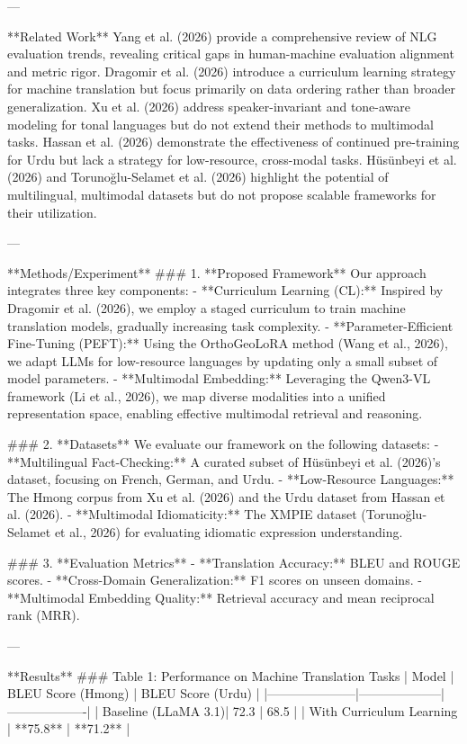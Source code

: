 ---

**Related Work**  
Yang et al. (2026) provide a comprehensive review of NLG evaluation trends, revealing critical gaps in human-machine evaluation alignment and metric rigor. Dragomir et al. (2026) introduce a curriculum learning strategy for machine translation but focus primarily on data ordering rather than broader generalization. Xu et al. (2026) address speaker-invariant and tone-aware modeling for tonal languages but do not extend their methods to multimodal tasks. Hassan et al. (2026) demonstrate the effectiveness of continued pre-training for Urdu but lack a strategy for low-resource, cross-modal tasks. Hüsünbeyi et al. (2026) and Torunoğlu-Selamet et al. (2026) highlight the potential of multilingual, multimodal datasets but do not propose scalable frameworks for their utilization.  

---

**Methods/Experiment**  
### 1. **Proposed Framework**  
Our approach integrates three key components:  
- **Curriculum Learning (CL):** Inspired by Dragomir et al. (2026), we employ a staged curriculum to train machine translation models, gradually increasing task complexity.  
- **Parameter-Efficient Fine-Tuning (PEFT):** Using the OrthoGeoLoRA method (Wang et al., 2026), we adapt LLMs for low-resource languages by updating only a small subset of model parameters.  
- **Multimodal Embedding:** Leveraging the Qwen3-VL framework (Li et al., 2026), we map diverse modalities into a unified representation space, enabling effective multimodal retrieval and reasoning.  

### 2. **Datasets**  
We evaluate our framework on the following datasets:  
- **Multilingual Fact-Checking:** A curated subset of Hüsünbeyi et al. (2026)'s dataset, focusing on French, German, and Urdu.  
- **Low-Resource Languages:** The Hmong corpus from Xu et al. (2026) and the Urdu dataset from Hassan et al. (2026).  
- **Multimodal Idiomaticity:** The XMPIE dataset (Torunoğlu-Selamet et al., 2026) for evaluating idiomatic expression understanding.  

### 3. **Evaluation Metrics**  
- **Translation Accuracy:** BLEU and ROUGE scores.  
- **Cross-Domain Generalization:** F1 scores on unseen domains.  
- **Multimodal Embedding Quality:** Retrieval accuracy and mean reciprocal rank (MRR).  

---

**Results**  
### Table 1: Performance on Machine Translation Tasks  
| Model               | BLEU Score (Hmong) | BLEU Score (Urdu) |  
|---------------------|--------------------|-------------------|  
| Baseline (LLaMA 3.1)| 72.3               | 68.5              |  
| With Curriculum Learning | **75.8**        | **71.2**          |  

